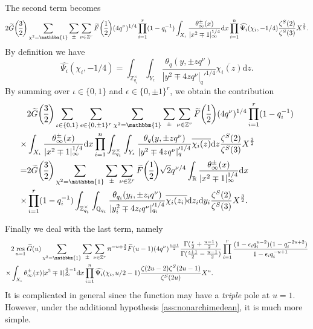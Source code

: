\documentclass[10pt,oneside,reqno]{amsart}
\makeatletter
\newcommand\rmd{\mathrm{d}}
\newcommand\QQ{\mathbb{Q}}
\newcommand\RR{\mathbb{R}}
\newcommand\ZZ{\mathbb{Z}}
\newcommand\triv{\mathbbm{1}}
\DeclareMathOperator\res{res}
\newcommand\legendresymbol[2]{\genfrac{(}{)}{}{}{#1}{#2}}
\theoremstyle{THEOREM}
\theoremstyle{DEFINITION}
\theoremstyle{EXERCISE}
\numberwithin{equation}{section}
\renewenvironment{proof}[1][\proofname]{\par
  \vspace{-6pt}
  \pushQED{\qed}
  \normalfont \topsep6\p@\@plus6\p@\relax
  \trivlist
  \item[\hskip\labelsep\rmfamily\bfseries
    #1\@addpunct{:}]\ignorespaces
}{
  \popQED\endtrivlist\@endpefalse
  \vspace{-6pt}
}
\makeatother
\begin{document}
\begin{proof}
The second term becomes
\[
2\widetilde{G}\legendresymbol{3}{2}\sum_{\chi^2=\triv}\sum_{\pm}\sum_{\nu\in \ZZ^r}\widetilde{F}\legendresymbol{1}{2}(4q^\nu)^{1/4} \prod_{i=1}^{r}(1-q_i^{-1})\int_{X_\iota}\frac{\theta_\infty^\pm(x)}{|x^2\mp 1|_\infty^{1/4}}\rmd x\prod_{i=1}^{n}\widehat{\Psi_i}(\chi_i,-1/4)\frac{\zeta^S(2)}
{\zeta^S(3)}X^{\frac32}.
\]
By definition we have
\[
\widehat{\Psi_i}(\chi_i,-1/4)=\int_{\ZZ_{q_i}^\times}\int_{Y_\epsilon}\frac{\theta_{q}(y,\pm zq^\nu)}{|y^2\mp 4zq^\nu|_q'^{1/4}}\overline{\chi_i(z)}\rmd z.
\]
By summing over $\iota\in \{0,1\}$ and $\epsilon\in \{0,\pm 1\}^r$, we obtain the contribution
\begin{align*}
&2\widetilde{G}\legendresymbol{3}{2}\sum_{\iota\in \{0,1\}}\sum_{\epsilon\in \{0,\pm 1\}^r}\sum_{\chi^2=\triv}\sum_{\pm}\sum_{\nu\in \ZZ^r}\widetilde{F}\legendresymbol{1}{2}(4q^\nu)^{1/4} \prod_{i=1}^{r}(1-q_i^{-1})\\
\times&\int_{X_\iota}\frac{\theta_\infty^\pm(x)}{|x^2\mp 1|_\infty^{1/4}}\rmd x\prod_{i=1}^{n}\int_{\ZZ_{q_i}^\times}\int_{Y_\epsilon}\frac{\theta_{q}(y,\pm zq^\nu)}{|y^2\mp 4zq^\nu|_q'^{1/4}}\overline{\chi_i(z)}\rmd z\frac{\zeta^S(2)}
{\zeta^S(3)}X^{\frac32}\\
=&2\widetilde{G}\legendresymbol{3}{2}\sum_{\chi^2=\triv}\sum_{\pm}\sum_{\nu\in \ZZ^r}\widetilde{F}\legendresymbol{1}{2}\sqrt{2} q^{\nu/4} \int_{\RR}\frac{\theta_\infty^\pm(x)}{|x^2\mp 1|_\infty^{1/4}}\rmd x\\
\times&\prod_{i=1}^{r}(1-q_i^{-1})\int_{\ZZ_{q_i}^\times}\int_{\QQ_{q_i}}\frac{\theta_{q_i}(y_i,\pm z_i q^\nu)}{|y_i^2\mp 4z_iq^\nu|_{q_i}'^{1/4}}\overline{\chi_i(z_i)}\rmd z_i\rmd y_i \frac{\zeta^S(2)}{\zeta^S(3)}X^{\frac32}.
\end{align*}

Finally we deal with the last term, namely
\begin{equation}\label{eq:lasttermres1}
\begin{split}
&2\res_{u=1}\widetilde{G}(u)\sum_{\chi^2=\triv}\sum_{\pm}\sum_{\nu\in \ZZ^r}\uppi^{  -u+\frac32}\widetilde{F}(u-1)(4q^\nu)^{\frac{u-1}{2}} \frac{\Gamma(\frac{\iota}{2}+\frac{u-1}{2})}{\Gamma(\frac{\iota+1}{2}-\frac{u-1}{2})} \prod_{i=1}^{r}\frac{(1-\epsilon_i q_i^{u-2})(1-q_i^{-2u+2})}{1-\epsilon_iq_i^{-u+1}}\\
\times&\int_{X_\iota}\theta_\infty^\pm(x)|x^2\mp 1|_\infty^{\frac u2-1}\rmd x\prod_{i=1}^{n}\widehat{\Psi_i}(\chi_i,u/2-1)\frac{\zeta(2u-2)\zeta^S(2u-1)}
{\zeta^S(2u)}X^u.
\end{split}
\end{equation}
It is complicated in general since the function may have a \emph{triple} pole at $u=1$. However, under the additional hypothesis \autoref{ass:nonarchimedean}, it is much more simple.


\end{proof}
\end{document}
